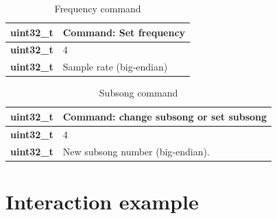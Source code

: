 \documentclass{article}
\begin{document}
\begin{table}
\begin{center}
\caption{Frequency command}
\label{tab:command_set_frequency}
\begin{tabular}{|r|l|}
\hline
\textbf{uint32\_t} & Command: Set frequency\\
\hline
\textbf{uint32\_t} & 4\\
\hline
\textbf{uint32\_t} & Sample rate (big-endian)\\
\hline
\end{tabular}
\end{center}
\end{table}

\begin{table}
\begin{center}
\caption{Subsong command}
\label{tab:command_subsong}
\begin{tabular}{|r|l|}
\hline
\textbf{uint32\_t} & Command: change subsong or set subsong\\
\hline
\textbf{uint32\_t} & 4\\
\hline
\textbf{uint32\_t} & New subsong number (big-endian).\\
\hline
\end{tabular}
\end{center}
\end{table}

\section{Interaction example}
\end{document}
